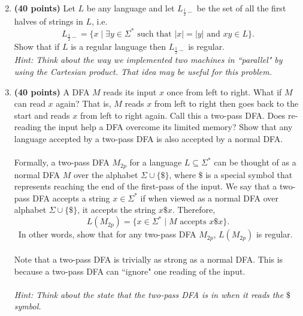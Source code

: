 \documentclass[12pt]{article}
\theoremstyle{definition}
\numberwithin{equation}{section}
\begin{document}
\begin{enumerate}
\setcounter{enumi}{1}
     \item {\bf (40 points)}
Let $L$ be any language and let $L_{\frac{1}{2}-}$ be the set of all the first
halves of strings in $L$, i.e.\
$$L_{\frac{1}{2}-} = \{x \mid \exists y\in \Sigma^{*} \text{ such that } \vert x\vert = \vert y\vert \text{ and } xy \in L \}.$$
Show that if $L$ is a regular language then $L_{\frac{1}{2}-}$ is regular.\\
\emph{Hint: Think about the way we implemented two machines in ``parallel" by using the Cartesian product. That idea may be useful for this problem.}

\item {\bf (40 points)}
A DFA $M$ reads its input $x$ once from left to right. What if $M$ can read $x$ again? That is, $M$ reads $x$ from left to right then goes back to the start and reads $x$ from left to right again. Call this a two-pass DFA. Does re-reading the input help a DFA overcome its limited memory? Show that any language accepted by a two-pass DFA is also accepted by a normal DFA. \\~\\

Formally, a two-pass DFA $M_{2p}$ for a language $L \subseteq \Sigma^*$ can be thought of as a normal DFA $M$ over the alphabet $\Sigma \cup \{\$\}$, where $\$$ is a special symbol that represents reaching the end of the first-pass of the input. We say that a two-pass DFA accepts a string $x \in \Sigma^*$ if when viewed as a  normal DFA over alphabet $\Sigma \cup \{\$\}$, it accepts the string $x\$x$. Therefore,
\[
L(M_{2p}) = \{x \in \Sigma^* \mid M \text{ accepts } x\$x\}.
\]\
In other words, show that for any two-pass DFA $M_{2p}$, $L(M_{2p})$ is regular.
\\~\\
Note that a two-pass DFA is trivially as strong as a normal DFA. This is because a two-pass DFA can ``ignore" one reading of the input. \\~\\
 
\emph{Hint: Think about the state that the two-pass DFA is in when it reads the $\$$ symbol.}



\end{enumerate}
\end{document}
